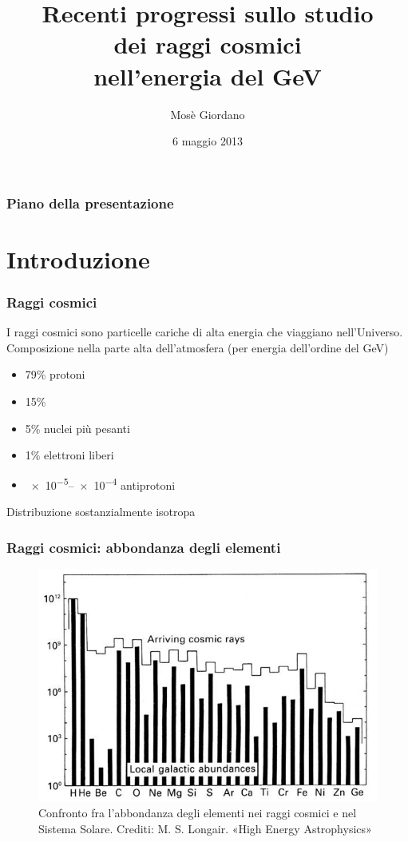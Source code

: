 \documentclass[10pt]{beamer}
\title[Recenti progressi sullo studio dei raggi cosmici (GeV)]{Recenti progressi
  sullo studio \\ dei raggi cosmici \\ nell'energia del GeV}
\author{Mosè Giordano}
\date{6 maggio 2013}
\institute{Università del Salento}
\begin{document}
\begin{frame}
  \maketitle
\end{frame}

\begin{frame}
  \frametitle{Piano della presentazione}
  \tableofcontents
\end{frame}

\section{Introduzione}


\begin{frame}
  \frametitle{Raggi cosmici}
  I \alert{raggi cosmici} sono \alert{particelle cariche di alta energia} che
  viaggiano nell'Universo.  Composizione nella parte alta dell'atmosfera (per
  energia dell'ordine del \si{\giga\electronvolt})
  \begin{itemize}
  \item 79\% protoni
  \item 15\% \PGa
  \item 5\% nuclei più pesanti
  \item 1\% elettroni liberi
  \item \numrange[range-phrase=--]{e-5}{e-4} antiprotoni
  \end{itemize}
  Distribuzione \alert{sostanzialmente isotropa}
\end{frame}

\begin{frame}
  \frametitle{Raggi cosmici: abbondanza degli elementi}
  \begin{figure}
    \centering
    \includegraphics[width=0.8\columnwidth]{cr-abundances}
    \caption{Confronto fra l'abbondanza degli elementi nei raggi cosmici e nel
      Sistema Solare.  Crediti: M. S. Longair. «High Energy Astrophysics»}
  \end{figure}
\end{frame}
\end{document}
